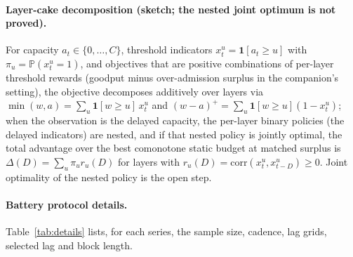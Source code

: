 \documentclass[11pt]{article}
\begin{document}
\paragraph{Layer-cake decomposition (sketch; the nested joint optimum is not proved).}
For capacity $a_t\in\{0,\dots,C\}$, threshold indicators
$x^u_t=\mathbf 1[a_t\ge u]$ with $\pi_u=\mathbb P(x^u_t{=}1)$, and
objectives that are positive combinations of per-layer threshold rewards
(goodput minus over-admission surplus in the companion's setting), the
objective decomposes additively over layers via
$\min(w,a)=\sum_u\mathbf 1[w\ge u]\,x^u_t$ and
$(w-a)^+=\sum_u\mathbf 1[w\ge u](1-x^u_t)$; when the observation is the delayed capacity, the per-layer binary policies
(the delayed indicators) are nested, and if that nested policy is jointly
optimal, the total advantage over the best comonotone static budget at
matched surplus is $\Delta(D)=\sum_u\pi_u r_u(D)$ for layers with
$r_u(D)=\mathrm{corr}(x^u_t,x^u_{t-D})\ge0$. Joint optimality of the nested
policy is the open step.

\paragraph{Battery protocol details.} Table~\ref{tab:details} lists, for each series, the sample size, cadence, lag grids, selected lag and block length.
\end{document}
